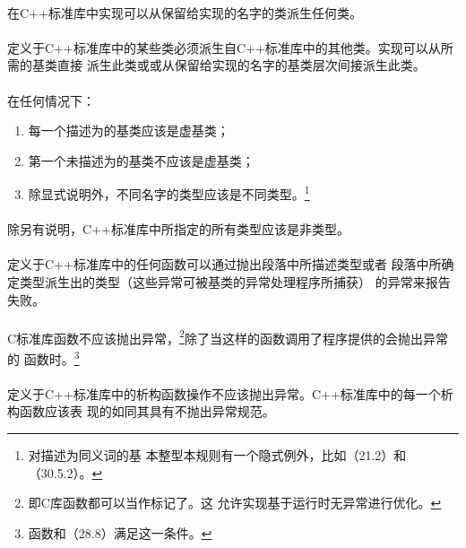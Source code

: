 \paragraph{}
在C++标准库中实现可以从保留给实现的名字的类派生任何类。

\paragraph{}
定义于C++标准库中的某些类必须派生自C++标准库中的其他类。实现可以从所需的基类直接
派生此类或或从保留给实现的名字的基类层次间接派生此类。

\paragraph{}
在任何情况下：
\begin{enumerate}
  \item{每一个描述为的基类应该是虚基类；}
  \item{第一个未描述为的基类不应该是虚基类；}
  \item{除显式说明外，不同名字的类型应该是不同类型。\footnote{对描述为同义词的基
    本整型本规则有一个隐式例外，比如（21.2）和
    （30.5.2）。}}
\end{enumerate}

\paragraph{}
除另有说明，C++标准库中所指定的所有类型应该是非类型。

\paragraph{}
定义于C++标准库中的任何函数可以通过抛出段落中所描述类型或者
段落中所确定类型派生出的类型（这些异常可被基类的异常处理程序所捕获）
的异常来报告失败。

\paragraph{}
C标准库函数不应该抛出异常，\footnote{即C库函数都可以当作标记了。这
允许实现基于运行时无异常进行优化。}除了当这样的函数调用了程序提供的会抛出异常的
函数时。\footnote{函数和（28.8）满足这一条件。}

\paragraph{}
定义于C++标准库中的析构函数操作不应该抛出异常。C++标准库中的每一个析构函数应该表
现的如同其具有不抛出异常规范。

